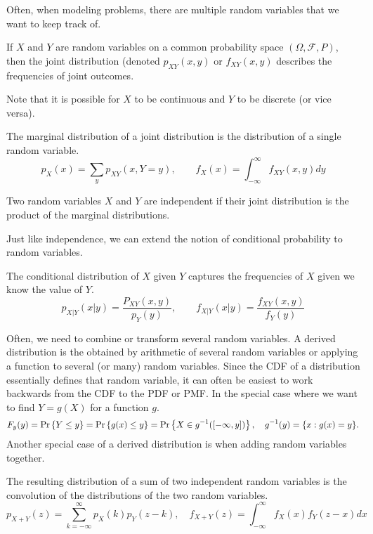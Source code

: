 Often, when modeling problems, there are multiple random variables that we want to keep track of.
\begin{definition}
	If $X$ and $Y$ are random variables on a common probability space $(\Omega, \mathcal{F}, P)$, then the joint distribution (denoted $p_{XY}(x, y)$ or $f_{XY}(x, y)$ describes the frequencies of joint outcomes.
  \label{defn:joint-dist}
\end{definition}
Note that it is possible for $X$ to be continuous and $Y$ to be discrete (or vice versa).
\begin{definition}
  The marginal distribution of a joint distribution is the distribution of a single random variable.
  \[
	p_X(x) = \sum_yp_{XY}(x, Y=y), \qquad f_X(x) = \int_{-\infty}^{\infty}f_{XY}(x, y)dy
  \]
  \label{defn:marginal-dist}
\end{definition}
\begin{definition}
  Two random variables $X$ and $Y$ are independent if their joint distribution is the product of the marginal distributions.
  \label{defn:rv-independence}
\end{definition}
Just like independence, we can extend the notion of conditional probability to random variables.
\begin{definition}
  The conditional distribution of $X$ given $Y$ captures the frequencies of $X$ given we know the value of $Y$.
  \[
	p_{X|Y}(x|y) = \frac{P_{XY}(x, y)}{p_Y(y)}, \qquad f_{X|Y}(x|y) = \frac{f_{XY}(x, y)}{f_Y(y)}
  \]
  \label{defn:conditional-dist}
\end{definition}
Often, we need to combine or transform several random variables.
A derived distribution is the obtained by arithmetic of several random variables or applying a function to several (or many) random variables.
Since the CDF of a distribution essentially defines that random variable, it can often be easiest to work backwards from the CDF to the PDF or PMF.
In the special case where we want to find $Y=g(X)$ for a function $g$.
\[
  F_y(y) =\text{Pr}\left\{Y \leq y\right\} = \text{Pr}\left\{g(x) \leq y\right\} = \text{Pr}\left\{X \in g^{-1}([-\infty, y])\right\}, \quad g^{-1}(y) = \{ x: g(x) = y \}.
\]
Another special case of a derived distribution is when adding random variables together.
\begin{theorem}
  The resulting distribution of a sum of two independent random variables is the convolution of the distributions of the two random variables.
  \[
	p_{X+Y}(z) = \sum_{k=-\infty}^{\infty}p_X(k)p_Y(z-k), \quad f_{X+Y}(z) = \int_{-\infty}^{\infty}f_X(x)f_Y(z - x)dx
  \]
  \label{thm:convolution}
\end{theorem}
